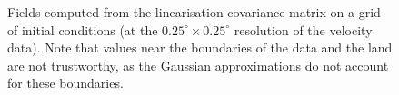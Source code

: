 \begin{figure}
\begin{center}
		\caption{Fields computed from the linearisation covariance matrix on a grid of initial conditions (at the \(0.25^\circ \times 0.25^\circ\) resolution of the velocity data).
			Note that values near the boundaries of the data and the land are not trustworthy, as the Gaussian approximations do not account for these boundaries.}
		\label{fig:na_stoch_fields}
	\end{center}
\end{figure}




